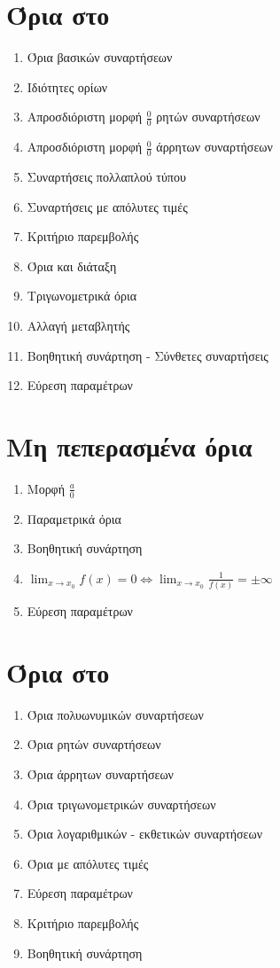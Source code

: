 \documentclass[twoside,nofonts,math,spyros,ektypwsh]{frontisthrio}
\begin{document}
\section{Όρια στο }
\begin{multicols}{2}
\begin{enumerate}
\item Όρια βασικών συναρτήσεων
\item Ιδιότητες ορίων
\item Απροσδιόριστη μορφή $ \frac{0}{0} $ ρητών συναρτήσεων
\item Απροσδιόριστη μορφή $ \frac{0}{0} $ άρρητων συναρτήσεων
\item Συναρτήσεις πολλαπλού τύπου
\item Συναρτήσεις με απόλυτες τιμές
\item Κριτήριο παρεμβολής
\item Όρια και διάταξη
\item Τριγωνομετρικά όρια
\item Αλλαγή μεταβλητής
\item Βοηθητική συνάρτηση - Σύνθετες συναρτήσεις
\item Εύρεση παραμέτρων
\end{enumerate}
\end{multicols}
\section{Μη πεπερασμένα όρια}
\begin{multicols}{2}
\begin{enumerate}
\item Μορφή $ \frac{a}{0} $
\item Παραμετρικά όρια
\item Βοηθητική συνάρτηση
\item $ \displaystyle{\lim_{x\to x_0}{f(x)}=0\Leftrightarrow\lim_{x\to x_0}{\frac{1}{f(x)}}=\pm\infty} $
\item Εύρεση παραμέτρων
\end{enumerate}
\end{multicols}
\section{Όρια στο \bmath{$ \pm\infty $}}
\begin{multicols}{2}
\begin{enumerate}
\item Όρια πολυωνυμικών συναρτήσεων
\item Όρια ρητών συναρτήσεων
\item Όρια άρρητων συναρτήσεων
\item Όρια τριγωνομετρικών συναρτήσεων
\item Όρια λογαριθμικών - εκθετικών συναρτήσεων
\item Όρια με απόλυτες τιμές
\item Εύρεση παραμέτρων
\item Κριτήριο παρεμβολής
\item Βοηθητική συνάρτηση
\end{enumerate}
\end{multicols}
\end{document}
